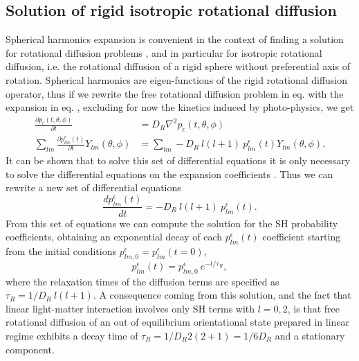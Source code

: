 \documentclass{article}
\begin{document}
\subsection{Solution of rigid isotropic rotational diffusion}
Spherical harmonics expansion is convenient in the context of finding a solution for rotational diffusion problems \cite{Fisz1996b}, and in particular for  isotropic rotational diffusion, i.e. the rotational diffusion of a rigid sphere without preferential axis of rotation. Spherical harmonics are eigen-functions of the rigid rotational diffusion operator, thus if we rewrite the free rotational diffusion problem in eq.  with the expansion in eq. , excluding for now the kinetics induced by photo-physics, we get
\begin{equation}\label{eq:diffusion_expansion}
\begin{aligned}
    \frac{\partial p_\epsilon(t,\theta,\phi)}{\partial t} 
    &=
    D_R \nabla^2 p_\epsilon(t,\theta,\phi) \\
    \sum_{lm}
    \frac{\partial p^\epsilon_{lm}(t)}{\partial t} Y_{lm}(\theta,\phi) 
    &=
    \sum_{lm}
        -D_R \ l(l+1) \ p^\epsilon_{lm}(t) Y_{lm}(\theta,\phi).
\end{aligned}
\end{equation}
It can be shown that to solve this set of differential equations it is only necessary to solve the differential equations on the expansion coefficients \cite{Fisz1996a}. Thus we can rewrite a new set of differential equations
\begin{equation}\label{eq:diffusion_expansion_coeffs}
    \frac{d p^\epsilon_{lm}(t)}{d t} =
    -D_R \ l(l+1) \ p^\epsilon_{lm}(t).
\end{equation}
From this set of equations we can compute the solution for the SH probability coefficients, obtaining an exponential decay of each $p^\epsilon_{lm}(t)$ coefficient starting from the initial conditions $p^\epsilon_{lm,0}=p^\epsilon_{lm}(t=0)$, 
\begin{equation}\label{eq:diffusion_solution}
    p^\epsilon_{lm}(t) =
    p^\epsilon_{lm,0} \ e^{-t/\tau_R},
\end{equation}
where the relaxation times of the diffusion terms are specified as $\tau_R = 1/D_R \ l(l+1)$. A consequence coming from this solution, and the fact that linear light-matter interaction involves only SH terms with $l=0,2$, is that free rotational diffusion of an out of equilibrium orientational state prepared in linear regime exhibits a decay time of $\tau_R = 1/D_R2(2+1) = 1/6D_R$ and a stationary component.
\end{document}
